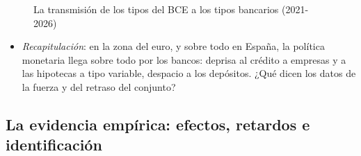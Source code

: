 \documentclass[11pt]{article}
\begin{document}
\begin{figure}[H]
\centering
\caption{La transmisión de los tipos del BCE a los tipos bancarios (2021-2026)}\label{fig:transmision-tipos-2022}
\end{figure}

\begin{itemize}
\item \emph{Recapitulación}: en la zona del euro, y sobre todo en España, la política monetaria llega sobre todo por los bancos: deprisa al crédito a empresas y a las hipotecas a tipo variable, despacio a los depósitos. ¿Qué dicen los datos de la fuerza y del retraso del conjunto?
\end{itemize}

\subsection{La evidencia empírica: efectos, retardos e identificación}\label{sec:evidencia}
\end{document}
